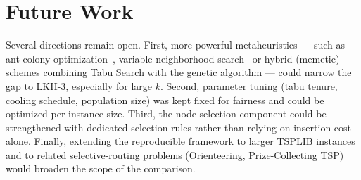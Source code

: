 \documentclass[12pt,a4paper,oneside]{report}
\begin{document}
\section{Future Work}\label{sec:future}
Several directions remain open. First, more powerful metaheuristics --- such as
ant colony optimization~\cite{dorigo1997acs}, variable neighborhood
search~\cite{mladenovic1997vns} or hybrid (memetic) schemes combining Tabu Search
with the genetic algorithm --- could narrow the gap to LKH-3, especially for large
$k$. Second, parameter tuning (tabu tenure, cooling schedule, population size) was
kept fixed for fairness and could be optimized per instance size. Third, the
node-selection component could be strengthened with dedicated selection rules
rather than relying on insertion cost alone. Finally, extending the reproducible
framework to larger TSPLIB instances and to related selective-routing problems
(Orienteering, Prize-Collecting TSP) would broaden the scope of the comparison.

\clearpage


\end{document}
